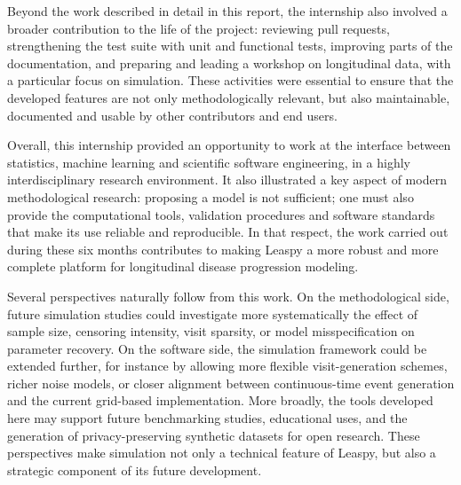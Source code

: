 \documentclass{rapportCS}
\begin{document}
Beyond the work described in detail in this report, the internship also involved a broader contribution to the life of the project: reviewing pull requests, strengthening the test suite with unit and functional tests, improving parts of the documentation, and preparing and leading a workshop on longitudinal data, with a particular focus on simulation. These activities were essential to ensure that the developed features are not only methodologically relevant, but also maintainable, documented and usable by other contributors and end users.

Overall, this internship provided an opportunity to work at the interface between statistics, machine learning and scientific software engineering, in a highly interdisciplinary research environment. It also illustrated a key aspect of modern methodological research: proposing a model is not sufficient; one must also provide the computational tools, validation procedures and software standards that make its use reliable and reproducible. In that respect, the work carried out during these six months contributes to making Leaspy a more robust and more complete platform for longitudinal disease progression modeling.

Several perspectives naturally follow from this work. On the methodological side, future simulation studies could investigate more systematically the effect of sample size, censoring intensity, visit sparsity, or model misspecification on parameter recovery. On the software side, the simulation framework could be extended further, for instance by allowing more flexible visit-generation schemes, richer noise models, or closer alignment between continuous-time event generation and the current grid-based implementation. More broadly, the tools developed here may support future benchmarking studies, educational uses, and the generation of privacy-preserving synthetic datasets for open research. These perspectives make simulation not only a technical feature of Leaspy, but also a strategic component of its future development.
\newpage



\end{document}
